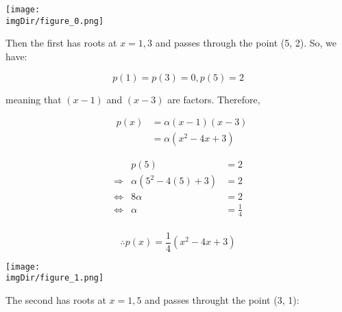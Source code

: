 \documentclass[MathsNotesBase.tex]{subfiles}
\begin{document}
{	\begin{center}
	\texttt{[image: \\imgDir/figure\_0.png]}
	\end{center}
	
	
	\begin{par}
	\begin{flushleft}
	Then the first has roots at $x=1,3$ and passes through the point (5, 2). So, we have:
	\end{flushleft}
	\end{par}
	
	\begin{par}
	$$p(1)=p(3)=0, p(5) = 2$$
	\end{par}
	
	\begin{par}
	\begin{flushleft}
	meaning that $\left(x-1\right)$ and $\left(x-3\right)$ are factors. Therefore,
	\end{flushleft}
	\end{par}
	
	\begin{par}
	$$\begin{array}{lcr}
	&p(x) &= \alpha(x-1)(x-3)\\
	&&= \alpha(x^2-4x+3)
	\end{array}$$
	\end{par}
	
	\begin{par}
	$$\begin{array}{lcr}
	&p(5)&=2 \\
	\Longrightarrow &\alpha(5^2-4(5) + 3) &= 2 \\
	\iff &8\alpha&=2\\
	\iff &\alpha &= \frac{1}{4}\\
	\end{array}$$
	\end{par}
	
	\begin{par}
	$$\therefore p(x) = \frac{1}{4}(x^2-4x+3)$$
	\end{par}
	
	
	\begin{center}
	\texttt{[image: \\imgDir/figure\_1.png]}
	\end{center}
	
	
	\begin{par}
	\begin{flushleft}
	The second has roots at $x=1,5$ and passes throught the point (3, 1):
	\end{flushleft}
	\end{par}
	
}
\end{document}

